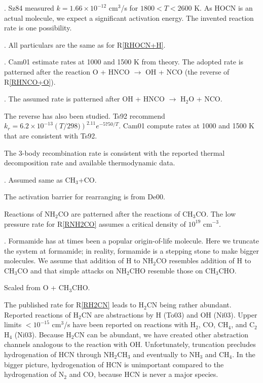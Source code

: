 \documentclass[12pt,landscape]{article}
\newcounter{reaction}
\begin{document}
. Sz84 measured $k=1.66\times 10^{-12}$ cm$^3$/s for $1800<T<2600$ K.  As HOCN is an actual molecule, we expect a significant activation energy.  The invented reaction rate is one possibility. 

.  All particulars are the same as for R\ref{RHOCN+H}.

. Cam01 estimate rates at 1000 and 1500 K from theory.  The adopted rate is patterned after the reaction O + HNCO $\rightarrow$ OH + NCO
(the reverse of R\ref{RHNCO+O}).

. The assumed rate is patterned after  OH + HNCO $\rightarrow$ H$_2$O + NCO.

  The reverse has also been studied.  Ts92 recommend $k_r = 6.2\times 10^{-13} \left(T/298)\right)^{2.11} e^{-5750/T}$.
Cam01 compute rates at 1000 and 1500 K that are consistent with Ts92.  

  The 3-body recombination rate is consistent with the reported thermal decomposition rate and available thermodynamic data.

.  Assumed same as CH$_3$+CO.

  The activation barrier for rearranging is from De00.

  Reactions of NH$_2$CO are patterned after the reactions of CH$_3$CO.  The low pressure rate for R\ref{RNH2CO}
assumes a critical density of $10^{19}$ cm$^{-3}$.

.  Formamide has at times been a popular origin-of-life molecule.  Here we truncate the system at formamide; in reality, formamide is a stepping stone to make bigger molecules.
We assume that addition of H to NH$_2$CO resembles addition of H to CH$_3$CO
and that simple attacks on NH$_2$CHO resemble those on CH$_3$CHO.

  Scaled from O + CH$_3$CHO.

 The published rate for R\ref{RH2CN} leads to H$_2$CN being rather abundant.  Reported reactions of H$_2$CN are abstractions by H (To03) and OH (Ni03).  Upper limits $<10^{-15}$ cm$^3$/s have been reported on reactions with H$_2$, CO, CH$_4$, and C$_2$H$_4$ (Ni03).  Because H$_2$CN can be abundant, we have created other abstraction channels analogous to the reaction with OH.  Unfortunately, truncation precludes hydrogenation of HCN through NH$_2$CH$_3$ and eventually to NH$_3$ and CH$_4$.  In the bigger picture, hydrogenation of HCN is unimportant compared to the hydrogenation of N$_2$ and CO, because HCN is never a major species.  
 
\end{document}
